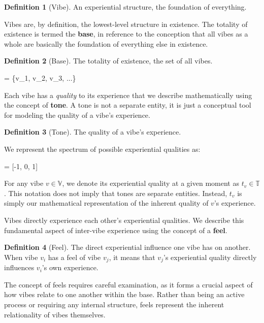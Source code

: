 \documentclass{article}
\let\oldequation\equation
\let\endoldequation\endequation
\renewenvironment{equation}{%
    \noindent\vspace{-\parskip}\vspace{-\baselineskip}%
    \oldequation
}{%
    \endoldequation
    \noindent\vspace{-\parskip}\vspace{-\baselineskip}%
}
\theoremstyle{definition}
\theoremstyle{axiom}
\theoremstyle{theorem}
\theoremstyle{lemma}
\theoremstyle{proposition}
\newtheorem{definition}{Definition}      %
\begin{document}
\begin{definition}[Vibe]
  An experiential structure, the foundation of everything.
\end{definition}

Vibes are, by definition, the lowest-level structure in existence. The totality of existence is termed the \textbf{base}, in reference to the conception that all vibes as a whole are basically the foundation of everything else in existence.

\begin{definition}[Base]
  The totality of existence, the set of all vibes.

  \begin{equation}
   = \{v_1, v_2, v_3, ...\}
  \end{equation}
\end{definition}

Each vibe has a \textit{quality} to its experience that we describe mathematically using the concept of \textbf{tone}. A tone is not a separate entity, it is just a conceptual tool for modeling the quality of a vibe's experience.

\begin{definition}[Tone]
  The quality of a vibe's experience.
\end{definition}

We represent the spectrum of possible experiential qualities as:

\begin{equation}
 = [-1, 0, 1]
\end{equation}

For any vibe $v \in \mathbb{V}$, we denote its experiential quality at a given moment as ${t}_v \in \mathbb{T}$. This notation does not imply that tones are separate entities. Instead, ${t}_v$ is simply our mathematical representation of the inherent quality of $v$'s experience.

Vibes directly experience each other's experiential qualities. We describe this fundamental aspect of inter-vibe experience using the concept of a \textbf{feel}.

\begin{definition}[Feel]
The direct experiential influence one vibe has on another. When vibe $v_i$ has a feel of vibe $v_j$, it means that $v_j$'s experiential quality directly influences $v_i$'s own experience.
\end{definition}

The concept of feels requires careful examination, as it forms a crucial aspect of how vibes relate to one another within the base. Rather than being an active process or requiring any internal structure, feels represent the inherent relationality of vibes themselves.
\end{document}
